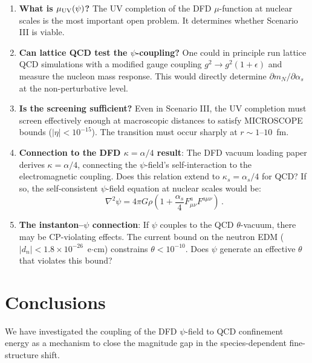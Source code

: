 \documentclass[aps,prd,twocolumn,superscriptaddress,floatfix,nofootinbib]{revtex4-2}
\newcommand{\mufunction}{\mu}
\newcommand{\kap}{\kappa}
\newcommand{\as}{\alpha_s}
\newcommand{\mN}{m_N}
\begin{document}
\begin{enumerate}
\item \textbf{What is $\mufunction_{\rm UV}(\psi)$?} The UV completion of the
DFD $\mufunction$-function at nuclear scales is the most important open problem.
It determines whether Scenario III is viable.

\item \textbf{Can lattice QCD test the $\psi$-coupling?} One could in principle
run lattice QCD simulations with a modified gauge coupling $g^2 \to g^2(1 +
\epsilon)$ and measure the nucleon mass response. This would directly determine
$\partial\mN / \partial\as$ at the non-perturbative level.

\item \textbf{Is the screening sufficient?} Even in Scenario III, the UV
completion must screen effectively enough at macroscopic distances to satisfy
MICROSCOPE bounds ($|\eta| < 10^{-15}$). The transition must occur sharply at
$r \sim 1$--$10$~fm.

\item \textbf{Connection to the DFD $\kap = \alpha/4$ result}: The DFD vacuum
loading paper derives $\kap = \alpha/4$, connecting the $\psi$-field's
self-interaction to the electromagnetic coupling. Does this relation extend to
$\kap_s = \as/4$ for QCD? If so, the self-consistent $\psi$-field equation at
nuclear scales would be:
\begin{equation}
\nabla^2\psi = 4\pi G\rho \left(1 + \frac{\as}{4} F^a_{\mu\nu} F^{a\mu\nu}\right)
\, .
\end{equation}

\item \textbf{The instanton--$\psi$ connection}: If $\psi$ couples to the QCD
$\theta$-vacuum, there may be CP-violating effects. The current bound on the
neutron EDM ($|d_n| < 1.8 \times 10^{-26}$~e$\cdot$cm) constrains $\theta <
10^{-10}$. Does $\psi$ generate an effective $\theta$ that violates this bound?
\end{enumerate}


\section{Conclusions}
\label{sec:conclusions}

We have investigated the coupling of the DFD $\psi$-field to QCD confinement
energy as a mechanism to close the magnitude gap in the species-dependent
fine-structure shift.
\end{document}
